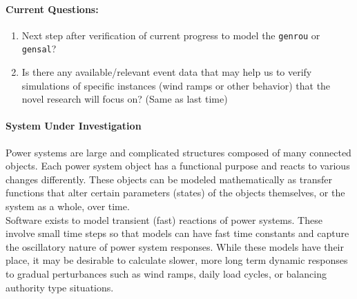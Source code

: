 \documentclass[12pt]{article}
\begin{document}
	\paragraph{Current Questions:}
	\begin{enumerate}
		
		
		\item Next step after verification of current progress to model the \verb|genrou| or \verb|gensal|?
		
		\item Is there any available/relevant event data that may help us to verify simulations of specific instances (wind ramps or other behavior) that the novel research will focus on? (Same as last time)
	\end{enumerate}
	\begin{comment}
	\paragraph{Random Thoughts:}
	\begin{enumerate}
	\item Numerical integration at beginning of simulation may require extra care as to avoid out of index errors. -Maybe not because python can do limited negative indexing.
	\end{enumerate}
	\end{comment}
\pagebreak
\paragraph{System Under Investigation}
Power systems are large and complicated structures composed of many connected objects. Each power system object has a functional purpose and reacts to various changes differently. These objects can be modeled mathematically as transfer functions that alter certain parameters (states) of the objects themselves, or the system as a whole, over time. \\

Software exists to model transient (fast) reactions of power systems. These involve small time steps so that models can have fast time constants and capture the oscillatory nature of power system responses. While these models have their place, it may be desirable to calculate slower, more long term dynamic responses to gradual perturbances such as wind ramps, daily load cycles, or balancing authority type situations. \\
\end{document}
